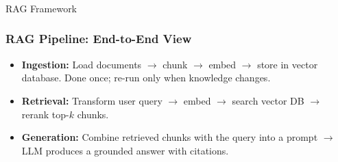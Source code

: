 
\begin{frame}[fragile]\frametitle{}
\begin{center}
{\Large RAG Framework}
\end{center}
\end{frame}

\begin{frame}[fragile]\frametitle{RAG Pipeline: End-to-End View}


\begin{itemize}
  \item \textbf{Ingestion:} Load documents $\rightarrow$ chunk $\rightarrow$ embed $\rightarrow$ store in vector database. Done once; re-run only when knowledge changes.
  \item \textbf{Retrieval:} Transform user query $\rightarrow$ embed $\rightarrow$ search vector DB $\rightarrow$ rerank top-$k$ chunks.
  \item \textbf{Generation:} Combine retrieved chunks with the query into a prompt $\rightarrow$ LLM produces a grounded answer with citations.
\end{itemize}



\end{frame}



